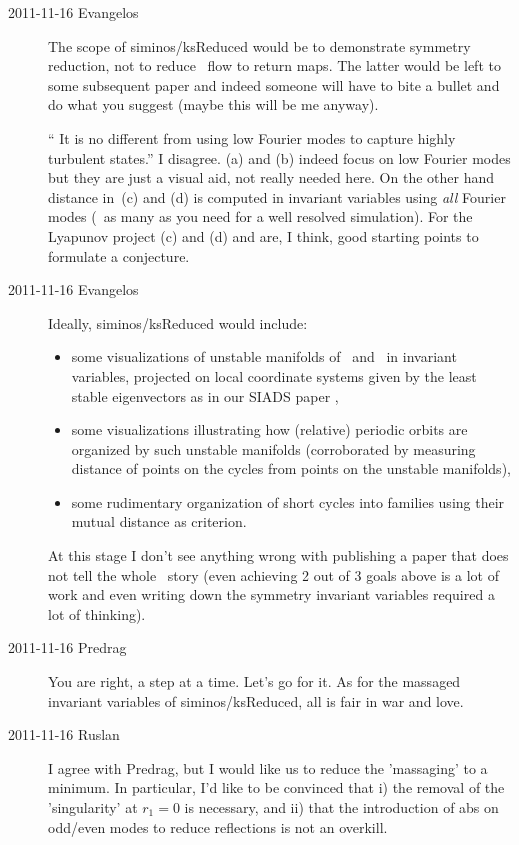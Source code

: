 \begin{description}
\item[2011-11-16 Evangelos] The scope of siminos/ksReduced would be to
demonstrate symmetry reduction, not to reduce \KS\ flow to return maps.
The latter would be left to some subsequent paper and indeed someone will have
to bite a bullet and do what you suggest (maybe this will be me anyway).

`` It is no different from using low Fourier modes to capture
highly turbulent states.'' I disagree. (a)
and (b) indeed focus on low Fourier modes but they are just a visual aid,
not really needed here. On the other hand distance in
\,(c) and (d) is computed in invariant variables using
\emph{all} Fourier modes (\ie\ as many as you need for a well resolved
simulation). For the Lyapunov project (c) and (d)
and  are, I think, good starting points to formulate
a conjecture.

\item[2011-11-16 Evangelos]
Ideally, siminos/ksReduced would include:
\begin{itemize}
 \item some visualizations of unstable manifolds of \eqva\ and \reqva\
	in invariant variables, projected on local coordinate systems
	given by the least stable eigenvectors as in our
	SIADS paper ,
 \item some visualizations illustrating how (relative) periodic orbits are
	organized by such unstable manifolds (corroborated by measuring distance
	of points on the cycles from points on the unstable manifolds),
 \item some rudimentary organization of short cycles into families using
	their mutual distance as criterion.
\end{itemize}

At this stage I don't see anything wrong with publishing a paper that does
not tell the whole \KS\ story (even achieving 2 out of 3 goals above is a lot
of work and even writing down the symmetry invariant variables required a lot
of thinking).

\item[2011-11-16 Predrag] You are right, a step at a time. Let's go for
it. As for the massaged invariant variables of siminos/ksReduced, all is
fair in war and love.

\item[2011-11-16 Ruslan] I agree with Predrag, but I would like us to
reduce the 'massaging' to a minimum.  In particular, I'd like to be
convinced that i) the removal of the 'singularity' at $r_1 = 0$ is
necessary, and ii) that the introduction of abs on odd/even modes to
reduce reflections is not an overkill.


\end{description}
